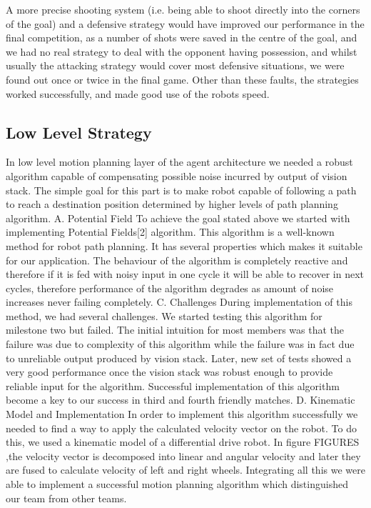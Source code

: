 A more precise shooting system (i.e. being able to shoot directly into the corners of the goal) and a defensive strategy would have improved our performance in the final competition, as a number of shots were saved in the centre of the goal, and we had no real strategy to deal with the opponent having possession, and whilst usually the attacking strategy would cover most defensive situations, we were found out once or twice in the final game. Other than these faults, the strategies worked successfully, and made good use of the robots speed.

\subsection{Low Level Strategy}
In low level motion planning layer of the agent architecture we needed a robust algorithm capable of compensating possible noise incurred by output of vision stack.  The simple goal for this part is to make robot capable of following a path to reach a destination position determined by higher levels of path planning algorithm.
A. Potential Field
To achieve the goal stated above we started with implementing Potential Fields[2] algorithm. This algorithm is a well-known method for robot path planning. It has several properties which makes it suitable for our application. The behaviour of the algorithm is completely reactive and therefore if it is fed with noisy input in one cycle it will be able to recover in next cycles, therefore performance of the algorithm degrades as amount of noise increases never failing completely.
C. Challenges
During implementation of this method, we had several challenges. We started testing this algorithm for milestone two but failed. The initial intuition for most members was that the failure was due to complexity of this algorithm while the failure was in fact due to unreliable output produced by vision stack. Later, new set of tests showed a very good performance once the vision stack was robust enough to provide reliable input for the algorithm. Successful implementation of this algorithm become a key to our success in third and fourth friendly matches.
D. Kinematic Model and Implementation
In order to implement this algorithm successfully we needed to find a way to apply the calculated velocity vector on the robot. To do this, we used a kinematic model of a differential drive robot. In figure FIGURES   ,the velocity vector is decomposed into linear and angular velocity and later they are fused to calculate velocity of left and right wheels.
Integrating all this we were able to implement a successful motion planning algorithm which distinguished our team from other teams.
